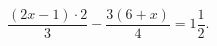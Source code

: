 \begin{ex}[type=equation]
	\begin{condition}
		$\dfrac{(2x-1)\cdot2}{3}-\dfrac{3(6+x)}{4}=1\dfrac{1}{2}.$
	\end{condition}
\end{ex}